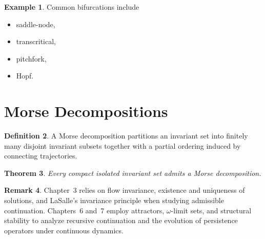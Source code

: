 \documentclass[11pt]{book}
\numberwithin{equation}{chapter}
\theoremstyle{definition}
\newtheorem{definition}{Definition}[chapter]
\newtheorem{example}[definition]{Example}
\newtheorem{remark}[definition]{Remark}
\theoremstyle{plain}
\newtheorem{theorem}[definition]{Theorem}
\begin{document}

\begin{example}

Common bifurcations include

\begin{itemize}

\item saddle-node,

\item transcritical,

\item pitchfork,

\item Hopf.

\end{itemize}

\end{example}


\section{Morse Decompositions}

\begin{definition}

A Morse decomposition partitions an invariant set into finitely many
disjoint invariant subsets together with a partial ordering induced by
connecting trajectories.

\end{definition}


\begin{theorem}

Every compact isolated invariant set admits a Morse decomposition.

\end{theorem}


\begin{remark}

Chapter~3 relies on flow invariance, existence and uniqueness of
solutions, and LaSalle's invariance principle when studying admissible
continuation. Chapters~6 and~7 employ attractors, $\omega$-limit sets,
and structural stability to analyze recursive continuation and the
evolution of persistence operators under continuous dynamics.

\end{remark}
\end{document}
